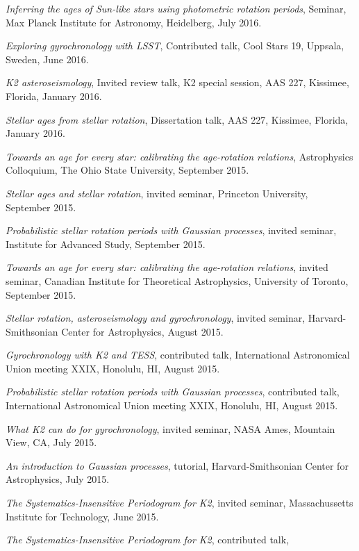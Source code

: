 \documentclass[12pt,letterpaper]{article}
\begin{document}
\begin{list}{}{\cvlist}
\item
{\it Inferring the ages of Sun-like stars using photometric rotation periods},
Seminar, Max Planck Institute for Astronomy, Heidelberg, July 2016.
\item
{\it Exploring gyrochronology with LSST}, Contributed talk, Cool Stars 19,
Uppsala, Sweden, June 2016.
\item
{\it K2 asteroseismology}, Invited review talk, K2 special session, AAS 227,
Kissimee, Florida, January 2016.
\item
{\it Stellar ages from stellar rotation}, Dissertation talk, AAS 227,
Kissimee, Florida, January 2016.
\item
{\it Towards an age for every star: calibrating the age-rotation relations},
Astrophysics Colloquium, The Ohio State University, September 2015.
\item
{\it Stellar ages and stellar rotation}, invited seminar, Princeton
University, September 2015.
\item
{\it Probabilistic stellar rotation periods with Gaussian processes},
invited seminar, Institute for Advanced Study, September 2015.
\item
{\it Towards an age for every star: calibrating the age-rotation relations},
invited seminar, Canadian Institute for Theoretical Astrophysics,
University of Toronto, September 2015.
\item
{\it Stellar rotation, asteroseismology and gyrochronology}, invited seminar,
Harvard-Smithsonian Center for Astrophysics, August 2015.
\item
{\it Gyrochronology with K2 and TESS}, contributed talk, International
Astronomical Union meeting XXIX, Honolulu, HI, August 2015.
\item
{\it Probabilistic stellar rotation periods with Gaussian processes},
contributed talk, International Astronomical Union meeting XXIX, Honolulu, HI,
August 2015.
\item
{\it What K2 can do for gyrochronology}, invited seminar, NASA Ames, Mountain
View, CA, July 2015.
\item
{\it An introduction to Gaussian processes}, tutorial, Harvard-Smithsonian
Center for Astrophysics, July 2015.
\item
{\it The Systematics-Insensitive Periodogram for K2}, invited seminar,
Massachussetts Institute for Technology, June 2015.
\item
{\it The Systematics-Insensitive Periodogram for K2}, contributed talk,

\end{list}
\end{document}
